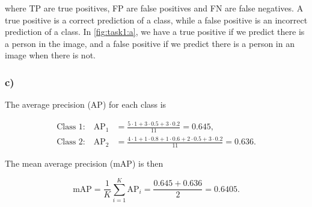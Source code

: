 where TP are true positives, FP are false positives and FN are false negatives. A true positive is a correct prediction of a class, while a false positive is an incorrect prediction of a class. In \cref{fig:task1:a}, we have a true positive if we predict there is a person in the image, and a false positive if we predict there is a person in an image when there is not.


\subsubsection*{c)}

The average precision (AP) for each class is

\begin{align*}
  \text{Class 1:}\quad \text{AP}_1 &= \frac{5\cdot 1 + 3\cdot0.5+3\cdot0.2}{11} = 0.645, \\
  \text{Class 2:}\quad \text{AP}_2 &= \frac{4\cdot1 + 1\cdot 0.8 + 1\cdot0.6 +2\cdot0.5+3\cdot0.2}{11} = 0.636.
\end{align*}

The mean average precision (mAP) is then

\begin{equation*}
  \text{mAP} = \frac{1}{K} \sum_{i=1}^K \text{AP}_i = \frac{0.645 + 0.636}{2} = 0.6405. 
\end{equation*}
